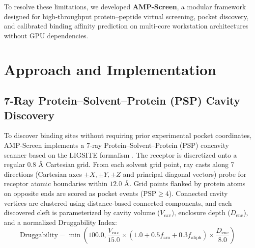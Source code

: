 \documentclass[10pt,twocolumn]{article}
\begin{document}
To resolve these limitations, we developed \textbf{AMP-Screen}, a modular framework designed for high-throughput protein--peptide virtual screening, pocket discovery, and calibrated binding affinity prediction on multi-core workstation architectures without GPU dependencies.

\section{Approach and Implementation}

\subsection{7-Ray Protein--Solvent--Protein (PSP) Cavity Discovery}
To discover binding sites without requiring prior experimental pocket coordinates, AMP-Screen implements a 7-ray Protein--Solvent--Protein (PSP) concavity scanner based on the LIGSITE formalism \cite{Hendlich1997}. The receptor is discretized onto a regular $0.8\text{ \AA}$ Cartesian grid. From each solvent grid point, ray casts along 7 directions (Cartesian axes $\pm X, \pm Y, \pm Z$ and principal diagonal vectors) probe for receptor atomic boundaries within $12.0\text{ \AA}$. Grid points flanked by protein atoms on opposite ends are scored as pocket events ($\text{PSP} \ge 4$). Connected cavity vertices are clustered using distance-based connected components, and each discovered cleft is parameterized by cavity volume ($V_{\text{cav}}$), enclosure depth ($D_{\text{enc}}$), and a normalized Druggability Index:
\begin{equation}
\text{Druggability} = \min\left(100.0, \frac{V_{\text{cav}}}{15.0} \times \left(1.0 + 0.5 f_{\text{aro}} + 0.3 f_{\text{aliph}}\right) \times \frac{D_{\text{enc}}}{8.0}\right)
\end{equation}
\end{document}
